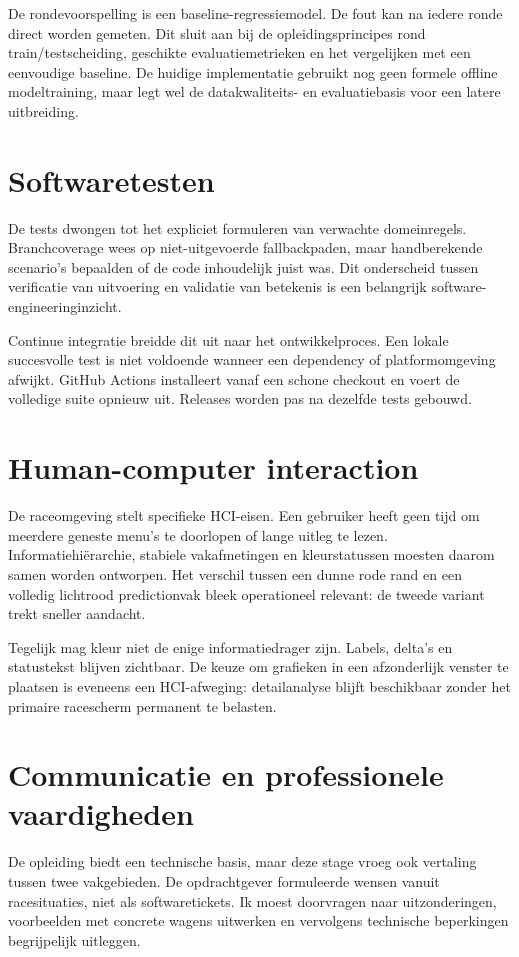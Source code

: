 De rondevoorspelling is een baseline-regressiemodel. De fout kan na iedere ronde direct worden gemeten. Dit sluit aan bij de opleidingsprincipes rond train/testscheiding, geschikte evaluatiemetrieken en het vergelijken met een eenvoudige baseline. De huidige implementatie gebruikt nog geen formele offline modeltraining, maar legt wel de datakwaliteits- en evaluatiebasis voor een latere uitbreiding.

\section{Softwaretesten}
De tests dwongen tot het expliciet formuleren van verwachte domeinregels. Branchcoverage wees op niet-uitgevoerde fallbackpaden, maar handberekende scenario's bepaalden of de code inhoudelijk juist was. Dit onderscheid tussen verificatie van uitvoering en validatie van betekenis is een belangrijk software-engineeringinzicht.

Continue integratie breidde dit uit naar het ontwikkelproces. Een lokale succesvolle test is niet voldoende wanneer een dependency of platformomgeving afwijkt. GitHub Actions installeert vanaf een schone checkout en voert de volledige suite opnieuw uit. Releases worden pas na dezelfde tests gebouwd.

\section{Human-computer interaction}
De raceomgeving stelt specifieke HCI-eisen. Een gebruiker heeft geen tijd om meerdere geneste menu's te doorlopen of lange uitleg te lezen. Informatiehiërarchie, stabiele vakafmetingen en kleurstatussen moesten daarom samen worden ontworpen. Het verschil tussen een dunne rode rand en een volledig lichtrood predictionvak bleek operationeel relevant: de tweede variant trekt sneller aandacht.

Tegelijk mag kleur niet de enige informatiedrager zijn. Labels, delta's en statustekst blijven zichtbaar. De keuze om grafieken in een afzonderlijk venster te plaatsen is eveneens een HCI-afweging: detailanalyse blijft beschikbaar zonder het primaire racescherm permanent te belasten.

\section{Communicatie en professionele vaardigheden}
De opleiding biedt een technische basis, maar deze stage vroeg ook vertaling tussen twee vakgebieden. De opdrachtgever formuleerde wensen vanuit racesituaties, niet als softwaretickets. Ik moest doorvragen naar uitzonderingen, voorbeelden met concrete wagens uitwerken en vervolgens technische beperkingen begrijpelijk uitleggen.

